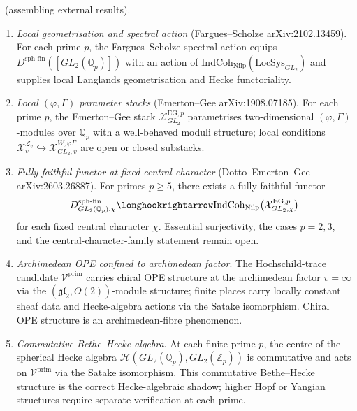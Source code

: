 \begin{theorem}
\label{v4-arith:fle-ledger:thm:local-inputs}
\ClaimStatusProvedHere\ (assembling external results).
\begin{enumerate}
\item \emph{Local geometrisation and spectral action}
  (Fargues--Scholze arXiv:2102.13459). For each prime \(p\),
  the Fargues--Scholze spectral action equips
  \(D^{\mathrm{sph}\text{-}\mathrm{fin}}([GL_{2}(\mathbb{Q}_{p})])\)
  with an action of \(\mathrm{IndCoh}_{\mathrm{Nilp}}(\mathrm{LocSys}_{GL_{2}})\)
  and supplies local Langlands geometrisation and Hecke functoriality.

\item \emph{Local \((\varphi,\Gamma)\) parameter stacks}
  (Emerton--Gee arXiv:1908.07185). For each prime \(p\), the
  Emerton--Gee stack
  \(\mathcal{X}^{\mathrm{EG},p}_{GL_{2}}\) parametrises
  two-dimensional \((\varphi,\Gamma)\)-modules over \(\mathbb{Q}_{p}\)
  with a well-behaved moduli structure; local conditions
  \(\mathcal{X}^{\mathcal{L}_{v}}_{v}\hookrightarrow
  \mathcal{X}^{W,\varphi\Gamma}_{GL_{2},v}\) are open or closed
  substacks.

\item \emph{Fully faithful functor at fixed central character}
  (Dotto--Emerton--Gee arXiv:2603.26887). For primes
  \(p \geq 5\), there exists a fully faithful functor
  \[
  D^{\mathrm{sph}\text{-}\mathrm{fin}}_{GL_{2}(\mathbb{Q}_{p}),\chi}
  \longhookrightarrow
  \mathrm{IndCoh}_{\mathrm{Nilp}}\bigl(\mathcal{X}^{\mathrm{EG},p}_{GL_{2},\chi}\bigr)
  \]
  for each fixed central character \(\chi\). Essential surjectivity,
  the cases \(p = 2,3\), and the central-character-family
  statement remain open.

\item \emph{Archimedean OPE confined to archimedean factor}.
  The Hochschild-trace candidate \(\mathcal{V}^{\mathrm{prim}}\)
  carries chiral OPE structure at the archimedean factor
  \(v = \infty\) via the \((\mathfrak{gl}_{2},O(2))\)-module structure;
  finite places carry locally constant sheaf data and Hecke-algebra
  actions via the Satake isomorphism. Chiral OPE structure is an
  archimedean-fibre phenomenon.

\item \emph{Commutative Bethe--Hecke algebra}.
  At each finite prime \(p\), the centre of the spherical Hecke algebra
  \(\mathcal{H}(GL_{2}(\mathbb{Q}_{p}),GL_{2}(\mathbb{Z}_{p}))\)
  is commutative and acts on
  \(\mathcal{V}^{\mathrm{prim}}\) via the Satake isomorphism. This
  commutative Bethe--Hecke structure is the correct Hecke-algebraic
  shadow; higher Hopf or Yangian structures require separate
  verification at each prime.


\end{enumerate}
\end{theorem}
